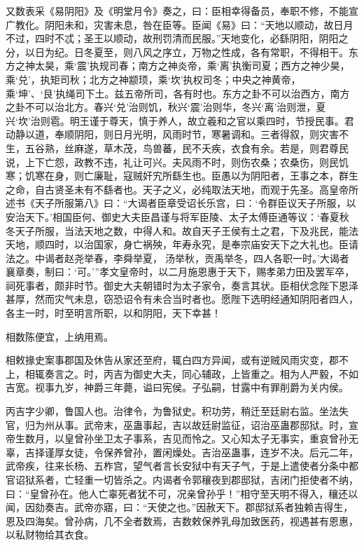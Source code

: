 \documentclass[12pt,UTF8]{ctexbook}
\begin{document}
又数表采《易阴阳》及《明堂月令》奏之，曰：臣相幸得备员，奉职不修，不能宣广教化。阴阳未和，灾害未息，咎在臣等。臣闻《易》曰：“天地以顺动，故日月不过，四时不忒；圣王以顺动，故刑罚清而民服。”天地变化，必繇阴阳，阴阳之分，以日为纪。日冬夏至，则八风之序立，万物之性成，各有常职，不得相干。东方之神太昊，乘‘震’执规司春；南方之神炎帝，乘‘离’执衡司夏；西方之神少昊，乘‘兑’，执矩司秋；北方之神颛顼，乘‘坎’执权司冬；中央之神黄帝，乘‘坤’、‘艮’执绳司下土。兹五帝所司，各有时也。东方之卦不可以治西方，南方之卦不可以治北方。春兴‘兑’治则饥，秋兴‘震’治则华，冬兴‘离’治则泄，夏兴‘坎’治则雹。明王谨于尊天，慎于养人，故立羲和之官以乘四时，节授民事。君动静以道，奉顺阴阳，则日月光明，风雨时节，寒暑调和。三者得叙，则灾害不生，五谷熟，丝麻遂，草木茂，鸟兽蕃，民不夭疾，衣食有余。若是，则君尊民说，上下亡怨，政教不违，礼让可兴。夫风雨不时，则伤农桑；农桑伤，则民饥寒；饥寒在身，则亡廉耻，寇贼奸宄所繇生也。臣愚以为阴阳者，王事之本，群生之命，自古贤圣未有不繇者也。天子之义，必纯取法天地，而观于先圣。高皇帝所述书《天子所服第八》曰：“大谒者臣章受诏长乐宫，曰：‘令群臣议天子所服，以安治天下。’相国臣何、御史大夫臣昌谨与将军臣陵、太子太傅臣通等议：‘春夏秋冬天子所服，当法天地之数，中得人和。故自天子王侯有土之君，下及兆民，能法天地，顺四时，以治国家，身亡祸殃，年寿永究，是奉宗庙安天下之大礼也。臣请法之。中谒者赵尧举春，李舜举夏，汤举秋，贡禹举冬，四人各职一时。’大谒者襄章奏，制曰：‘可。’”孝文皇帝时，以二月施恩惠于天下，赐孝弟力田及罢军卒，祠死事者，颇非时节。御史大夫朝错时为太子家令，奏言其状。臣相伏念陛下恩泽甚厚，然而灾气未息，窃恐诏令有未合当时者也。愿陛下选明经通知阴阳者四人，各主一时，时至明言所职，以和阴阳，天下幸甚！



相数陈便宜，上纳用焉。



相敕掾史案事郡国及休告从家还至府，辄白四方异闻，或有逆贼风雨灾变，郡不上，相辄奏言之。时，丙吉为御史大夫，同心辅政，上皆重之。相为人严毅，不如吉宽。视事九岁，神爵三年薨，谥曰宪侯。子弘嗣，甘露中有罪削爵为关内侯。



丙吉字少卿，鲁国人也。治律令，为鲁狱史。积功劳，稍迁至廷尉右监。坐法失官，归为州从事。武帝末，巫蛊事起，吉以故廷尉监征，诏治巫蛊郡邸狱。时，宣帝生数月，以皇曾孙坐卫太子事系，吉见而怜之。又心知太子无事实，重哀曾孙无辜，吉择谨厚女徒，令保养曾孙，置闲燥处。吉治巫蛊事，连岁不决。后元二年，武帝疾，往来长杨、五柞宫，望气者言长安狱中有天子气，于是上遣使者分条中都官诏狱系者，亡轻重一切皆杀之。内谒者令郭穰夜到郡邸狱，吉闭门拒使者不纳，曰：“皇曾孙在。他人亡辜死者犹不可，况亲曾孙乎！”相守至天明不得入，穰还以闻，因劾奏吉。武帝亦寤，曰：“天使之也。”因赦天下。郡邸狱系者独赖吉得生，恩及四海矣。曾孙病，几不全者数焉，吉数敕保养乳母加致医药，视遇甚有恩惠，以私财物给其衣食。
\end{document}

